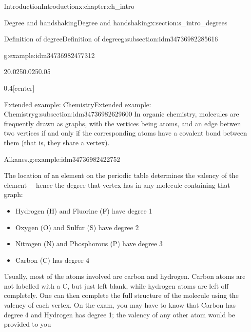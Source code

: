 \documentclass[oneside,10pt,]{book}
\numberwithin{equation}{section}
\begin{document}
\begin{chapterptx}{Introduction}{}{Introduction}{}{}{x:chapter:ch_intro}
\begin{sectionptx}{Degree and handshaking}{}{Degree and handshaking}{}{}{x:section:s_intro_degrees}
\begin{subsectionptx}{Definition of degree}{}{Definition of degree}{}{}{g:subsection:idm34736982285616}
\begin{example}{}{g:example:idm34736982477312}
\begin{sidebyside}{2}{0.025}{0.025}{0.05}
\begin{sbspanel}{0.4}[center]%
%
\end{sbspanel}%
\end{sidebyside}%
\end{example}
\end{subsectionptx}
%
%
\typeout{************************************************}
\typeout{************************************************}
%
\begin{subsectionptx}{Extended example: Chemistry}{}{Extended example: Chemistry}{}{}{g:subsection:idm34736982629600}
In organic chemistry, molecules are frequently drawn as graphs, with the vertices being atoms, and an edge betwen two vertices if and only if the corresponding atoms have a covalent bond between them (that is, they share a vertex).%
\begin{example}{Alkanes.}{g:example:idm34736982422752}%
\end{example}
The location of an element on the periodic table determines the valency of the element -{}-{} hence the degree that vertex has in any molecule containing that graph:%
%
\begin{itemize}[label=\textbullet]
\item{}Hydrogen (H) and Fluorine (F) have degree 1%
\item{}Oxygen (O) and Sulfur (S) have degree 2%
\item{}Nitrogen (N) and Phosphorous (P) have degree 3%
\item{}Carbon (C) has degree 4%
\end{itemize}
Usually, most of the atoms involved are carbon and hydrogen. Carbon atoms are not labelled with a C, but just left blank, while hydrogen atoms are left off completely. One can then complete the full structure of the molecule using the valency of each vertex.  On the exam, you may have to know that Carbon has degree 4 and Hydrogen has degree 1; the valency of any other atom would be provided to you%
\par

\end{subsectionptx}
\end{sectionptx}
\end{chapterptx}
\end{document}
